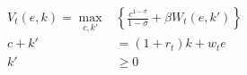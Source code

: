 \begin{align}
    V_t(e, k) = \max_{c, k'} & \left\{\frac{c^{1-\sigma}}{1-\sigma} + \beta W_t(e, k') \right\}
    \\ c + k' &= (1 + r_t)k + w_t e
    \\ k' &\geq 0
\end{align}
